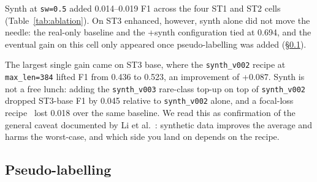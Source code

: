 Synth at \texttt{sw=0.5} added 0.014--0.019 F1 across the four ST1 and ST2 cells (Table~\ref{tab:ablation}). %
On ST3 enhanced, however, synth alone did not move the needle: the real-only baseline and the +synth configuration tied at 0.694, and the eventual gain on this cell only appeared once pseudo-labelling was added (\S\ref{sec:pseudo}). %

The largest single gain came on ST3 base, where the \texttt{synth\_v002} recipe at \texttt{max\_len=384} lifted F1 from 0.436 to 0.523, an improvement of +0.087. %
Synth is not a free lunch: adding the \texttt{synth\_v003} rare-class top-up on top of \texttt{synth\_v002} dropped ST3-base F1 by 0.045 relative to \texttt{synth\_v002} alone, and a focal-loss recipe~\cite{lin2017focal} lost 0.018 over the same baseline. %
We read this as confirmation of the general caveat documented by Li et al.~\cite{li2023synthdata}: synthetic data improves the average and harms the worst-case, and which side you land on depends on the recipe.

\subsection{Pseudo-labelling}
\label{sec:pseudo}

